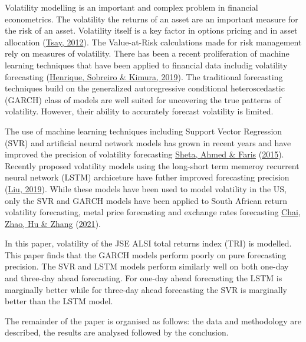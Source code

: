 \documentclass[11pt,preprint, authoryear]{elsarticle}
\numberwithin{equation}{section}
\numberwithin{figure}{section}
\numberwithin{table}{section}
\begin{document}
Volatility modelling is an important and complex problem in financial
econometrics. The volatility the returns of an asset are an important
measure for the risk of an asset. Volatility itself is a key factor in
options pricing and in asset allocation
(\protect\hyperlink{ref-tsay}{Tsay, 2012}). The Value-at-Risk
calculations made for risk management rely on measures of volatility.
There has been a recent proliferation of machine learning techniques
that have been applied to financial data includig volatility forecasting
(\protect\hyperlink{ref-lit_ml}{Henrique, Sobreiro \& Kimura, 2019}).
The traditional forecasting techniques build on the generalized
autoregressive conditional heteroscedastic (GARCH) class of models are
well suited for uncovering the true patterns of volatility. However,
their ability to accurately forecast volatility is limited.

\par

The use of machine learning techniques including Support Vector
Regression (SVR) and artificial neural network models has grown in
recent years and have improved the precision of volatility forecasting
\protect\hyperlink{ref-ann}{Sheta, Ahmed \& Faris}
(\protect\hyperlink{ref-ann}{2015}). Recently proposed volatility models
using the long-short term memeroy recurrent neural network (LSTM)
archiceture have futher improved forecasting precision
(\protect\hyperlink{ref-LIU}{Liu, 2019}). While these models have been
used to model volatility in the US, only the SVR and GARCH models have
been applied to South African return volatility forecasting, metal price
forecasting and exchange rates forecasting
\protect\hyperlink{ref-sa-gold}{Chai, Zhao, Hu \& Zhang}
(\protect\hyperlink{ref-sa-gold}{2021}).

\par

In this paper, volatility of the JSE ALSI total returns index (TRI) is
modelled. This paper finds that the GARCH models perform poorly on pure
forecasting precision. The SVR and LSTM models perform similarly well on
both one-day and three-day ahead forecasting. For one-day ahead
forecasting the LSTM is marginally better while for three-day ahead
forecasting the SVR is marginally better than the LSTM model.

\par

The remainder of the paper is organised as follows: the data and
methodology are described, the results are analysed followed by the
conclusion.
\end{document}
